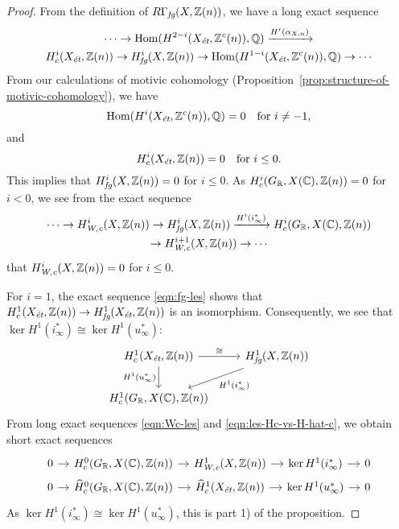 \documentclass[draft]{article}
\numberwithin{equation}{section}
\begin{document}
\begin{proof}
  From the definition of $R\Gamma_\fg (X, \ZZ(n))$, we have a long exact
  sequence
  \begin{multline}
    \label{eqn:fg-les}
    \cdots \to \Hom (H^{2-i} (X_\et, \ZZ^c (n)), \QQ) \xrightarrow{H^i (\alpha_{X,n})} \\
    H^i_c (X_\et, \ZZ(n)) \to
    H^i_\fg (X, \ZZ(n)) \to
    \Hom (H^{1-i} (X_\et, \ZZ^c (n)), \QQ) \to \cdots
  \end{multline}
  From our calculations of motivic cohomology
  (Proposition~\ref{prop:structure-of-motivic-cohomology}),
  we have
  $$\Hom (H^i (X_\et, \ZZ^c (n)), \QQ) = 0 \quad \text{for }i \ne -1,$$
  and
  $$H^i_c (X_\et, \ZZ(n)) = 0 \quad \text{for }i \le 0.$$
  This implies that $H^i_\fg (X, \ZZ(n)) = 0$ for $i \le 0$.
  As $H^i_c (G_\RR, X(\CC), \ZZ(n)) = 0$ for $i < 0$, we see from the exact
  sequence
  \begin{multline}
    \label{eqn:Wc-les}
    \cdots \to H^i_\Wc (X, \ZZ(n)) \to
    H^i_\fg (X,\ZZ(n)) \xrightarrow{H^i (i^*_\infty)}
    H^i_c (G_\RR, X(\CC), \ZZ(n)) \\
    \to H^{i+1}_\Wc (X, \ZZ(n)) \to \cdots
  \end{multline}
  that $H^i_\Wc (X, \ZZ(n)) = 0$ for $i \le 0$.

  \vspace{1em}

  For $i = 1$, the exact sequence \eqref{eqn:fg-les} shows that
  $H^1_c (X_\et, \ZZ(n)) \to H^1_\fg (X_\et, \ZZ(n))$ is an isomorphism.
  Consequently, we see that
  $\ker H^1 (i^*_\infty) \cong \ker H^1 (u_\infty^*)$:
  \[ \begin{tikzcd}
      H^1_c (X_\et, \ZZ(n)) \ar{r}{\cong}\ar{d}[swap]{H^1 (u^*_\infty)} & H^1_\fg (X, \ZZ(n)) \ar{dl}{H^1 (i^*_\infty)} \\
      H^1_c (G_\RR, X(\CC), \ZZ(n))
    \end{tikzcd} \]
  From long exact sequences \eqref{eqn:Wc-les} and
  \eqref{eqn:les-Hc-vs-H-hat-c}, we obtain short exact sequences
  \[ \begin{tikzcd}[column sep=1em,row sep=0pt]
      0 \ar{r} & H^0_c (G_\RR, X(\CC), \ZZ(n)) \ar{r} & H^1_\Wc (X, \ZZ(n)) \ar{r} & \ker H^1 (i^*_\infty) \ar{r} & 0 \\
      0 \ar{r} & \widehat{H}^0_c (G_\RR, X(\CC), \ZZ(n)) \ar{r} & \widehat{H}^1_c (X_\et, \ZZ(n)) \ar{r} & \ker H^1 (u_\infty^*) \ar{r} & 0
    \end{tikzcd} \]
  As $\ker H^1 (i^*_\infty) \cong \ker H^1 (u_\infty^*)$,
  this is part 1) of the proposition.


\end{proof}
\end{document}
